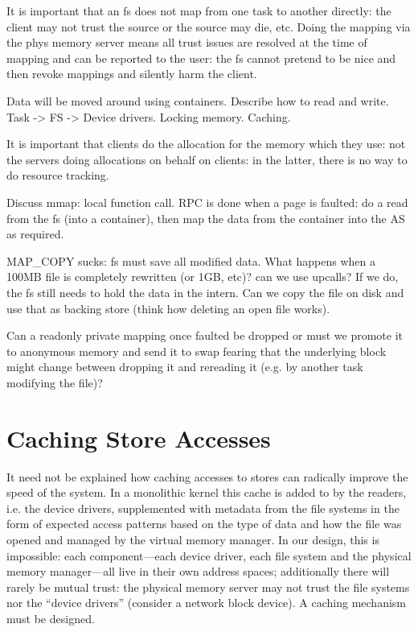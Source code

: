 It is important that an fs does not map from one task to another
directly: the client may not trust the source or the source may die,
etc.  Doing the mapping via the phys memory server means all trust
issues are resolved at the time of mapping and can be reported to the
user: the fs cannot pretend to be nice and then revoke mappings and
silently harm the client.

Data will be moved around using containers.  Describe how to read and
write.  Task -> FS -> Device drivers.  Locking memory.  Caching.

It is important that clients do the allocation for the memory which
they use: not the servers doing allocations on behalf on clients: in
the latter, there is no way to do resource tracking.

Discuss mmap: local function call.  RPC is done when a page is
faulted: do a read from the fs (into a container), then map the data
from the container into the AS as required.

MAP\_COPY sucks: fs must save all modified data.  What happens when a
100MB file is completely rewritten (or 1GB, etc)?  can we use upcalls?
If we do, the fs still needs to hold the data in the intern.  Can we
copy the file on disk and use that as backing store (think how
deleting an open file works).

Can a readonly private mapping once faulted be dropped or must we
promote it to anonymous memory and send it to swap fearing that the
underlying block might change between dropping it and rereading it
(e.g. by another task modifying the file)?

\section{Caching Store Accesses}

It need not be explained how caching accesses to stores can radically
improve the speed of the system.  In a monolithic kernel this cache is
added to by the readers, i.e. the device drivers, supplemented with
metadata from the file systems in the form of expected access patterns
based on the type of data and how the file was opened and managed by
the virtual memory manager.  In our design, this is impossible: each
component---each device driver, each file system and the physical
memory manager---all live in their own address spaces; additionally
there will rarely be mutual trust: the physical memory server may not
trust the file systems nor the ``device drivers'' (consider a network
block device).  A caching mechanism must be designed.

